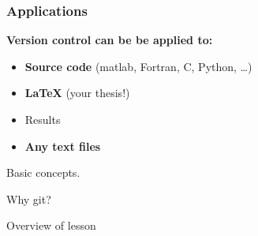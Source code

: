 \documentclass{beamer}
\begin{document}

\begin{frame}
  \frametitle{Applications}
  \textbf{\large Version control can be be applied to:}
  \begin{itemize}
  \item \textbf{Source code} (matlab, Fortran, C, Python, \dots)
  \item \textbf{LaTeX} (your thesis!)
  \item Results
  \item \textbf{Any text files}\footnotemark
  \end{itemize}
\end{frame}


\begin{frame}
  Basic concepts.
\end{frame}


\begin{frame}
  Why git?
\end{frame}


\begin{frame}
  Overview of lesson
\end{frame}
\end{document}
